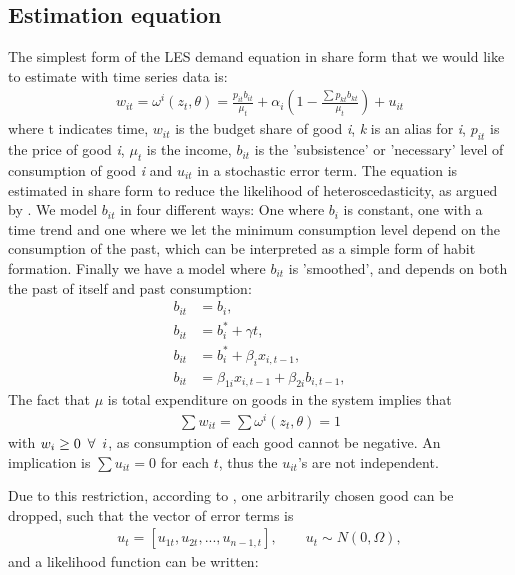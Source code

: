 \subsection{Estimation equation}\label{sec:estimationequation}
The simplest form of the LES demand equation in share form that we would like to estimate with time series data is:
\begin{align}
    w_{it} = \omega^i(z_t,\theta) = \frac{p_{it} b_{it}}{\mu_t} + \alpha_i \left( 1-\frac{\sum p_{kt}b_{kt}}{\mu_t}\right)+ u_{it}
\end{align}
where t indicates time, $w_{it}$ is the budget share of good \textit{i}, \textit{k} is an alias for \textit{i}, $p_{it}$ is the price of good \textit{i}, $\mu_t$ is the income, $b_{it}$ is the 'subsistence' or 'necessary' level of consumption of good \textit{i} and $u_{it}$ in a stochastic error term.  The equation is estimated in share form to reduce the likelihood of heteroscedasticity, as argued by \cite{pollak1992demand}. We model $b_{it}$ in four different ways: One where $b_i$ is constant, one with a time trend and one where we let the minimum consumption level depend on the consumption of the past, which can be interpreted as a simple form of habit formation. Finally we have a model where $b_{it}$ is 'smoothed', and depends on both the past of itself and past consumption:
\begin{align}
    b_{it} &= b_i, \label{constanteq}\\
    b_{it} &= b_i^* + \gamma t, \label{trendeq}\\
    b_{it} &= b_i^* + \beta_i x_{i,t-1}, \\ 
    b_{it} &= \beta_{1i} x_{i,t-1} +\beta_{2i} b_{i,t-1}   ,
\end{align}
The fact that $\mu$ is total expenditure on goods in the system implies that 
\begin{align}\label{eqsumofw}
    \sum w_{it} = \sum \omega^i(z_t,\theta)  = 1
\end{align}
with $w_i \geq 0  \hspace{0.5em} \forall  \hspace{0.5em} i$, as consumption of each good cannot be negative. An implication is $\sum u_{it} = 0$ for each $t$, thus the $u_{it}$'s are not independent.

Due to this restriction, according to \cite{pollak1992demand}, one arbitrarily chosen good can be dropped, such that the vector of error terms is
\begin{align}
    u_t = [u_{1t}, u_{2t},...,u_{n-1,t}], \qquad u_t \sim N(0,\Omega), 
\end{align}
and a likelihood function can be written:

